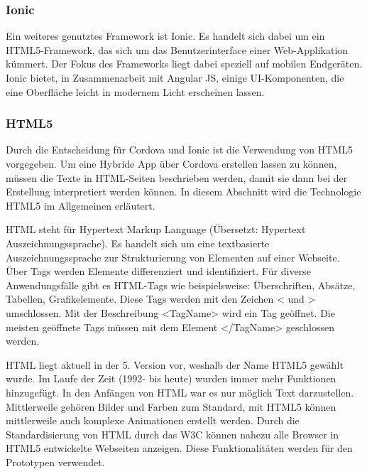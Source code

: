 \subsubsection{Ionic}
Ein weiteres genutztes Framework ist Ionic. Es handelt sich dabei um ein HTML5-Framework, das sich um das Benutzerinterface einer Web-Applikation kümmert. Der Fokus des Frameworks liegt dabei speziell auf mobilen Endgeräten.
Ionic bietet, in Zusammenarbeit mit Angular JS, einige UI-Komponenten, die eine Oberfläche leicht in modernem Licht erscheinen lassen.

\subsubsection{HTML5}

Durch die Entscheidung für Cordova und Ionic ist die Verwendung von HTML5 vorgegeben. Um eine Hybride App über Cordova erstellen lassen zu können, müssen die Texte in HTML-Seiten beschrieben werden, damit sie dann bei der Erstellung interpretiert werden können. In diesem Abschnitt wird die Technologie HTML5 im Allgemeinen erläutert.

HTML steht für Hypertext Markup Language (Übersetzt: Hypertext Auszeichnungssprache). Es handelt sich um eine textbasierte Auszeichnungssprache zur Strukturierung von Elementen auf einer Webseite. 
Über Tags werden Elemente differenziert und identifiziert. Für diverse Anwendungsfälle gibt es HTML-Tags wie beispielsweise: Überschriften, Absätze, Tabellen, Grafikelemente.
Diese Tags werden mit den Zeichen < und > umschlossen. Mit der Beschreibung <TagName> wird ein Tag geöffnet.  Die meisten geöffnete Tags müssen mit dem Element </TagName> geschlossen werden. 

HTML liegt aktuell in der 5. Version vor, weshalb der Name HTML5 gewählt wurde. Im Laufe der Zeit (1992- bis heute) wurden immer mehr Funktionen hinzugefügt. In den Anfängen von HTML war es nur möglich Text darzustellen. Mittlerweile gehören Bilder und Farben zum Standard, mit HTML5 können mittlerweile auch komplexe Animationen erstellt werden. Durch die Standardisierung von HTML durch das W3C können nahezu alle Browser in HTML5 entwickelte Webseiten anzeigen. Diese Funktionalitäten werden für den Prototypen verwendet.



